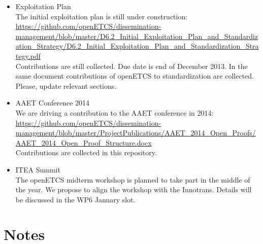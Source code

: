 \documentclass[a4paper, 11pt]{article}
\begin{document}
\begin{itemize}

\item Exploitation Plan\\
The initial exploitation plan is still under construction: \url{https://github.com/openETCS/dissemination-management/blob/master/D6.2_Initial_Exploitation_Plan_and_Standardization_Strategy/D6.2_Initial_Exploitation_Plan_and_Standardization_Strategy.pdf}\\

Contributions are still collected. Due date is end of December 2013. In the same document contributions of openETCS to standardization are collected. Please, update relevant sections.


\item AAET Conference 2014\\
We are driving a contribution to the AAET conference in 2014:
\url{https://github.com/openETCS/dissemination-management/blob/master/ProjectPublications/AAET_2014_Open_Proofs/AAET_2014_Open_Proof_Structure.docx}\\
Contributions are collected in this repository.

\item ITEA Summit\\
The openETCS midterm workshop is planned to take part in the middle of the year. We propose to align the workshop with the Innotrans. Details will be discussed in the WP6 January slot.
\end{itemize}

\section{Notes}
\end{document}
